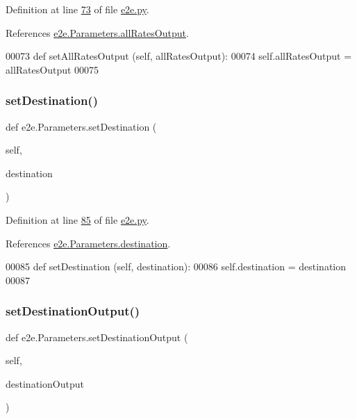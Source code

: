 Definition at line \hyperlink{e2e_8py_source_l00073}{73} of file \hyperlink{e2e_8py_source}{e2e.\+py}.



References \hyperlink{e2e_8py_source_l00032}{e2e.\+Parameters.\+all\+Rates\+Output}.


\begin{DoxyCode}
00073     \textcolor{keyword}{def }setAllRatesOutput (self, allRatesOutput):
00074         self.allRatesOutput = allRatesOutput
00075 
\end{DoxyCode}
\mbox{\label{classe2e_1_1_parameters_ac63ae6d2b5f45ae78ee855953a038f14}} 
\subsubsection{\texorpdfstring{set\+Destination()}{setDestination()}}
{\footnotesize\ttfamily def e2e.\+Parameters.\+set\+Destination (\begin{DoxyParamCaption}\item[{}]{self,  }\item[{}]{destination }\end{DoxyParamCaption})}



Definition at line \hyperlink{e2e_8py_source_l00085}{85} of file \hyperlink{e2e_8py_source}{e2e.\+py}.



References \hyperlink{e2e_8py_source_l00034}{e2e.\+Parameters.\+destination}.


\begin{DoxyCode}
00085     \textcolor{keyword}{def }setDestination (self, destination):
00086         self.destination = destination
00087 
\end{DoxyCode}
\mbox{\label{classe2e_1_1_parameters_a96083de53012ca50d2a345a1673802de}} 
\subsubsection{\texorpdfstring{set\+Destination\+Output()}{setDestinationOutput()}}
{\footnotesize\ttfamily def e2e.\+Parameters.\+set\+Destination\+Output (\begin{DoxyParamCaption}\item[{}]{self,  }\item[{}]{destination\+Output }\end{DoxyParamCaption})}



